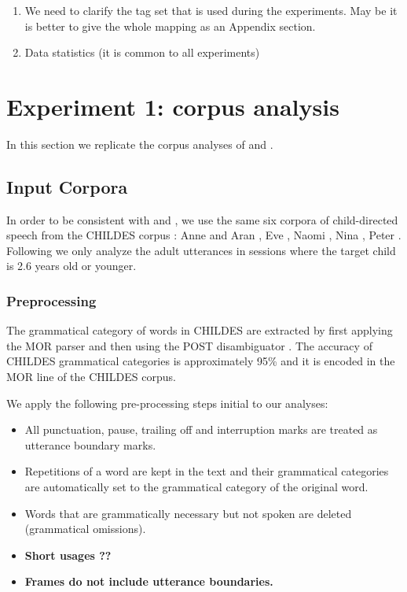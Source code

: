 \begin{enumerate}
\item We need to clarify the tag set that is used during the
  experiments. May be it is better to give the whole mapping as an
  Appendix section.
\item Data statistics (it is common to all experiments)
\end{enumerate}
\section{Experiment 1: corpus analysis}
In this section we replicate the corpus analyses of \cite{clair2010}
and \cite{Mintz200391}.  

\subsection{Input Corpora}

In order to be consistent with \cite{clair2010} and \cite{Mintz200391},
we use the same six corpora of child-directed speech from the CHILDES
corpus \citep*{macwhinney2000childes}: Anne and Aran
\citep*{theakston2001role}, Eve \citep*{JCL:1765112}, Naomi
\citep*{sachs1983talking}, Nina \citep*{suppes1974semantics}, Peter
\citep*{Bloom1974380, bloom1975structure}.  Following
\cite{Mintz200391} we only analyze the adult utterances in sessions
where the target child is 2.6 years old or younger.

\subsubsection{Preprocessing}

The grammatical category of words in CHILDES are extracted by first
applying the MOR parser \citep*{macwhinney2000childes} and then using
the POST disambiguator \citep*{sagae2004automatic}.  The accuracy of
CHILDES grammatical categories is approximately 95\%
\citep*{parisse2000automatic} and it is encoded in the MOR line of the
CHILDES corpus.

We apply the following pre-processing steps \citep*{clair2010} initial
to our analyses:
\begin{itemize}
\item All punctuation, pause, trailing off and interruption marks are
  treated as utterance boundary marks.
\item Repetitions of a word are kept in the text and their grammatical
  categories are automatically set to the grammatical category of the
  original word.
\item Words that are grammatically necessary but not spoken are
  deleted (grammatical omissions).
\item {\bf Short usages ??}
\item {\bf Frames do not include utterance
    boundaries. \cite{Mintz200391}}
\end{itemize}

